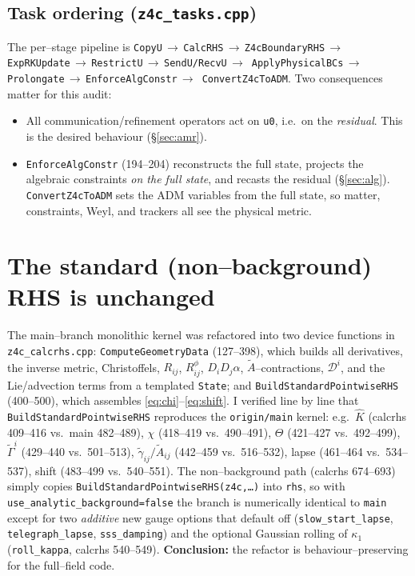 \documentclass[11pt]{article}
\newcommand{\code}[1]{\texttt{#1}}
\newcommand{\file}[1]{\texttt{#1}}
\newcommand{\gt}{\tilde\gamma}
\newcommand{\At}{\tilde A}
\newcommand{\Gamt}{\tilde\Gamma}
\begin{document}
\subsection{Task ordering (\file{z4c\_tasks.cpp})}
The per--stage pipeline is
\code{CopyU}\,$\to$\,\code{CalcRHS}\,$\to$\,\code{Z4cBoundaryRHS}\,$\to$\,
\code{ExpRKUpdate}\,$\to$\,\code{RestrictU}\,$\to$\,\code{SendU/RecvU}\,$\to$\,
\code{ApplyPhysicalBCs}\,$\to$\,\code{Prolongate}\,$\to$\,\code{EnforceAlgConstr}\,$\to$\,
\code{ConvertZ4cToADM}. Two consequences matter for this audit:
\begin{itemize}[leftmargin=1.4em,itemsep=1pt]
\item All communication/refinement operators act on \code{u0}, i.e.\ on the
\emph{residual}. This is the desired behaviour (\S\ref{sec:amr}).
\item \code{EnforceAlgConstr} (194--204) reconstructs the full state,
projects the algebraic constraints \emph{on the full state}, and recasts the
residual (\S\ref{sec:alg}). \code{ConvertZ4cToADM} sets the ADM variables from
the full state, so matter, constraints, Weyl, and trackers all see the
physical metric.
\end{itemize}

\section{The standard (non--background) RHS is unchanged}
\label{sec:standard}

The main--branch monolithic kernel was refactored into two device functions in
\file{z4c\_calcrhs.cpp}:
\code{ComputeGeometryData} (127--398), which builds all derivatives, the
inverse metric, Christoffels, $R_{ij}$, $R^\phi_{ij}$, $D_iD_j\alpha$,
$\At$--contractions, $\mathcal D^i$, and the Lie/advection terms from a
templated \code{State}; and \code{BuildStandardPointwiseRHS} (400--500), which
assembles \eqref{eq:chi}--\eqref{eq:shift}. I verified line by line that
\code{BuildStandardPointwiseRHS} reproduces the \file{origin/main} kernel:
e.g.\ $\hat K$ (calcrhs 409--416 vs.\ main 482--489), $\chi$ (418--419 vs.\
490--491), $\Theta$ (421--427 vs.\ 492--499), $\Gamt^i$ (429--440 vs.\
501--513), $\gt_{ij}/\At_{ij}$ (442--459 vs.\ 516--532), lapse (461--464 vs.\
534--537), shift (483--499 vs.\ 540--551). The non--background path
(calcrhs 674--693) simply copies \code{BuildStandardPointwiseRHS(z4c,\dots)}
into \code{rhs}, so with \code{use\_analytic\_background=false} the branch is
numerically identical to \file{main} except for two \emph{additive} new gauge
options that default off (\code{slow\_start\_lapse}, \code{telegraph\_lapse},
\code{sss\_damping}) and the optional Gaussian rolling of $\kappa_1$
(\code{roll\_kappa}, calcrhs 540--549). \textbf{Conclusion:} the refactor is
behaviour--preserving for the full--field code.
\end{document}
